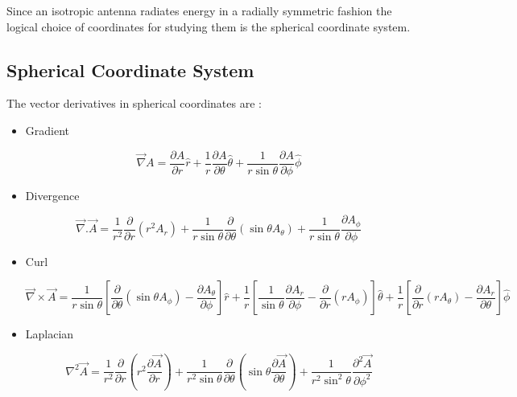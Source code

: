 Since an isotropic antenna radiates energy in a radially symmetric fashion the logical choice of coordinates for studying them is the spherical coordinate system.

\subsection{Spherical Coordinate System}

The vector derivatives in spherical coordinates are \cite{anton2002calculus}:

\begin{itemize}

   \item Gradient

      \begin{equation}
      \vec{\nabla} A = \frac{\partial A}{\partial r}\hat{r}+\frac{1}{r}\frac{\partial A}{\partial \theta}\hat{\theta}+\frac{1}{r\sin\theta}\frac{\partial A}{\partial \phi}\hat{\phi}
      \end{equation}

   \item Divergence

      \begin{equation}\label{divergence}
      \vec{\nabla}.\vec{A} = \frac{1}{r^2}\frac{\partial}{\partial r}(r^2A_r)+\frac{1}{r\sin\theta}\frac{\partial}{\partial\theta}(\sin\theta A_\theta)+\frac{1}{r\sin\theta}\frac{\partial A_\phi}{\partial\phi}
      \end{equation}

   \item Curl

      \begin{equation}
      \vec{\nabla}\times\vec{A} = \frac{1}{r\sin\theta}\left[\frac{\partial}{\partial\theta}(\sin\theta A_\phi)-\frac{\partial A_\theta}{\partial\phi}\right]\hat{r}+\frac{1}{r}\left[\frac{1}{\sin\theta}\frac{\partial A_r}{\partial\phi}-\frac{\partial}{\partial r}(rA_\phi)\right]\hat{\theta}+\frac{1}{r}\left[\frac{\partial}{\partial r}(rA_\theta)-\frac{\partial A_r}{\partial \theta}\right]\hat{\phi}
      \end{equation}

   \item Laplacian

      \begin{equation}\label{laplacian}
      \nabla^2 \vec{A} = \frac{1}{r^2}\frac{\partial}{\partial r}(r^2\frac{\partial\vec{A}}{\partial r})+\frac{1}{r^2\sin\theta}\frac{\partial}{\partial\theta}(\sin\theta\frac{\partial\vec{A}}{\partial \theta})+\frac{1}{r^2\sin^2\theta}\frac{\partial^2\vec{A}}{\partial \phi^2}
      \end{equation}

\end{itemize}

